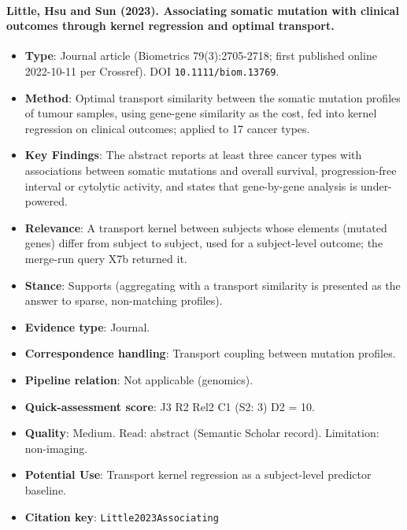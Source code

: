 \documentclass[journal,onecolumn]{IEEEtran}
\begin{document}
\paragraph{Little, Hsu and Sun (2023). Associating somatic mutation with clinical outcomes through kernel regression and optimal transport.~\cite{Little2023Associating}}\mbox{}

\begin{itemize}

\item{} \textbf{Type}: Journal article (Biometrics 79(3):2705-2718; first published online 2022-10-11 per Crossref). DOI \nolinkurl{10.1111/biom.13769}.

\item{} \textbf{Method}: Optimal transport similarity between the somatic mutation profiles of tumour samples, using gene-gene similarity as the cost, fed into kernel regression on clinical outcomes; applied to 17 cancer types.

\item{} \textbf{Key Findings}: The abstract reports at least three cancer types with associations between somatic mutations and overall survival, progression-free interval or cytolytic activity, and states that gene-by-gene analysis is under-powered.

\item{} \textbf{Relevance}: A transport kernel between subjects whose elements (mutated genes) differ from subject to subject, used for a subject-level outcome; the merge-run query X7b returned it.

\item{} \textbf{Stance}: Supports (aggregating with a transport similarity is presented as the answer to sparse, non-matching profiles).

\item{} \textbf{Evidence type}: Journal.

\item{} \textbf{Correspondence handling}: Transport coupling between mutation profiles.

\item{} \textbf{Pipeline relation}: Not applicable (genomics).

\item{} \textbf{Quick-assessment score}: J3 R2 Rel2 C1 (S2: 3) D2 = 10.

\item{} \textbf{Quality}: Medium. Read: abstract (Semantic Scholar record). Limitation: non-imaging.

\item{} \textbf{Potential Use}: Transport kernel regression as a subject-level predictor baseline.

\item{} \textbf{Citation key}: \texttt{Little2023Associating}

\end{itemize}
\end{document}
